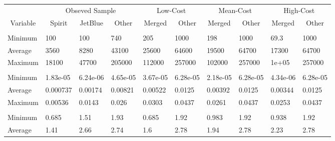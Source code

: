 
\begin{tabular}[t]{llllllllll}
\toprule
\multicolumn{1}{c}{ } & \multicolumn{3}{c}{Obseved Sample} & \multicolumn{2}{c}{Low-Cost} & \multicolumn{2}{c}{Mean-Cost} & \multicolumn{2}{c}{High-Cost} \\
\cmidrule(l{3pt}r{3pt}){2-4} \cmidrule(l{3pt}r{3pt}){5-6} \cmidrule(l{3pt}r{3pt}){7-8} \cmidrule(l{3pt}r{3pt}){9-10}
\multicolumn{1}{c}{Variable} & \multicolumn{1}{c}{Spirit} & \multicolumn{1}{c}{JetBlue} & \multicolumn{1}{c}{Other} & \multicolumn{1}{c}{Merged} & \multicolumn{1}{c}{Other} & \multicolumn{1}{c}{Merged} & \multicolumn{1}{c}{Other} & \multicolumn{1}{c}{Merged} & \multicolumn{1}{c}{Other} \\
\cmidrule(l{3pt}r{3pt}){1-1} \cmidrule(l{3pt}r{3pt}){2-2} \cmidrule(l{3pt}r{3pt}){3-3} \cmidrule(l{3pt}r{3pt}){4-4} \cmidrule(l{3pt}r{3pt}){5-5} \cmidrule(l{3pt}r{3pt}){6-6} \cmidrule(l{3pt}r{3pt}){7-7} \cmidrule(l{3pt}r{3pt}){8-8} \cmidrule(l{3pt}r{3pt}){9-9} \cmidrule(l{3pt}r{3pt}){10-10}
\addlinespace[0.3em]
\multicolumn{10}{l}{\textbf{Passengers}}\\
\hspace{1em}Minimum & 100 & 100 & 740 & 205 & 1000 & 198 & 1000 & 69.3 & 1000\\
\hspace{1em}Average & 3560 & 8280 & 43100 & 25600 & 64600 & 19500 & 64700 & 17300 & 64700\\
\hspace{1em}Maximum & 18100 & 47700 & 205000 & 112000 & 257000 & 102000 & 257000 & 1e+05 & 257000\\
\addlinespace[0.3em]
\multicolumn{10}{l}{\textbf{Market Share}}\\
\hspace{1em}Minimum & 1.83e-05 & 6.24e-06 & 4.65e-05 & 3.67e-05 & 6.28e-05 & 2.18e-05 & 6.28e-05 & 4.34e-06 & 6.28e-05\\
\hspace{1em}Average & 0.000737 & 0.00174 & 0.00821 & 0.00522 & 0.0125 & 0.00392 & 0.0125 & 0.00344 & 0.0125\\
\hspace{1em}Maximum & 0.00536 & 0.0143 & 0.026 & 0.0303 & 0.0437 & 0.0261 & 0.0437 & 0.0253 & 0.0437\\
\addlinespace[0.3em]
\multicolumn{10}{l}{\textbf{Prices}}\\
\hspace{1em}Minimum & 0.685 & 1.51 & 1.93 & 0.685 & 1.92 & 0.983 & 1.92 & 0.938 & 1.92\\
\hspace{1em}Average & 1.41 & 2.66 & 2.74 & 1.6 & 2.78 & 1.94 & 2.78 & 2.23 & 2.78\\

\end{tabular}
